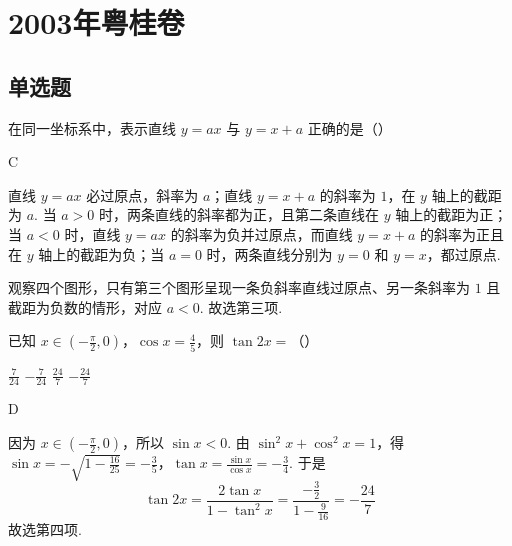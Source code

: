 \chapter{2003年粤桂卷}
\section{单选题}
\begin{problem}
在同一坐标系中，表示直线 \(y = ax\) 与 \(y = x + a\) 正确的是（\quad）

    {}
    {}
    {}
\end{problem}

\begin{answer}
C
\end{answer}

\begin{solution}
直线 \(y=ax\) 必过原点，斜率为 \(a\)；直线 \(y=x+a\) 的斜率为 \(1\)，在 \(y\) 轴上的截距为 \(a\). 当 \(a>0\) 时，两条直线的斜率都为正，且第二条直线在 \(y\) 轴上的截距为正；当 \(a<0\) 时，直线 \(y=ax\) 的斜率为负并过原点，而直线 \(y=x+a\) 的斜率为正且在 \(y\) 轴上的截距为负；当 \(a=0\) 时，两条直线分别为 \(y=0\) 和 \(y=x\)，都过原点.

观察四个图形，只有第三个图形呈现一条负斜率直线过原点、另一条斜率为 \(1\) 且截距为负数的情形，对应 \(a<0\). 故选第三项.
\end{solution}

\begin{problem}
已知 \(x \in \left(-\frac{\pi}{2}, 0\right)\)，\(\cos x = \frac{4}{5}\)，则 \(\tan 2x =\)（\quad）

\choices
    {\(\frac{7}{24}\)}
    {\(-\frac{7}{24}\)}
    {\(\frac{24}{7}\)}
    {\(-\frac{24}{7}\)}
\end{problem}

\begin{answer}
D
\end{answer}

\begin{solution}
因为 \(x\in\left(-\frac{\pi}{2},0\right)\)，所以 \(\sin x<0\). 由 \(\sin ^2x+\cos ^2x=1\)，得
\(\sin x=-\sqrt{1-\frac{16}{25}}=-\frac35\)，\(\tan x=\frac{\sin x}{\cos x}=-\frac34\).
于是
\[
\tan 2x=\frac{2\tan x}{1-\tan ^2x}=\frac{-\frac32}{1-\frac9{16}}=-\frac{24}{7}
\]
故选第四项.
\end{solution}

